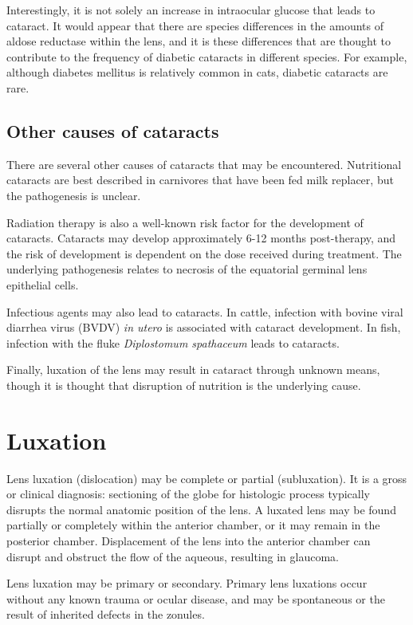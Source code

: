 \documentclass[openany]{book}
\begin{document}
Interestingly, it is not solely an increase in intraocular glucose that
leads to cataract. It would appear that there are species differences in
the amounts of aldose reductase within the lens, and it is these
differences that are thought to contribute to the frequency of diabetic
cataracts in different species. For example, although diabetes mellitus
is relatively common in cats, diabetic cataracts are rare.

\subsection{Other causes of cataracts}\label{other-causes-of-cataracts}

There are several other causes of cataracts that may be encountered.
Nutritional cataracts are best described in carnivores that have been
fed milk replacer, but the pathogenesis is unclear.

Radiation therapy is also a well-known risk factor for the development
of cataracts. Cataracts may develop approximately 6-12 months
post-therapy, and the risk of development is dependent on the dose
received during treatment. The underlying pathogenesis relates to
necrosis of the equatorial germinal lens epithelial cells.

Infectious agents may also lead to cataracts. In cattle, infection with
bovine viral diarrhea virus (BVDV) \emph{in utero} is associated with
cataract development. In fish, infection with the fluke
\emph{Diplostomum spathaceum} leads to cataracts.

Finally, luxation of the lens may result in cataract through unknown
means, though it is thought that disruption of nutrition is the
underlying cause.

\section{Luxation}\label{luxation}

Lens luxation (dislocation) may be complete or partial (subluxation). It
is a gross or clinical diagnosis: sectioning of the globe for histologic
process typically disrupts the normal anatomic position of the lens. A
luxated lens may be found partially or completely within the anterior
chamber, or it may remain in the posterior chamber. Displacement of the
lens into the anterior chamber can disrupt and obstruct the flow of the
aqueous, resulting in glaucoma.

Lens luxation may be primary or secondary. Primary lens luxations occur
without any known trauma or ocular disease, and may be spontaneous or
the result of inherited defects in the zonules.
\end{document}
